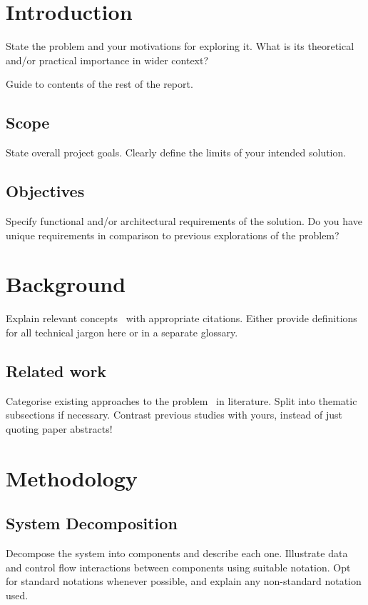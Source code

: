 \chapter{Introduction}

State the problem and your motivations for exploring it. What is its theoretical and/or practical importance in wider context?

Guide to contents of the rest of the report.

\section{Scope}

State overall project goals. Clearly define the limits of your intended solution. 

\section{Objectives}

Specify functional and/or architectural requirements of the solution. Do you have unique requirements in comparison to previous explorations of the problem? 


\chapter{Background}

Explain relevant concepts~\autocite{inbook} with appropriate citations. Either provide definitions for all technical jargon here or in a separate glossary.

\section{Related work}

Categorise existing approaches to the problem~\autocite{confwithpaper} in literature. Split into thematic subsections if necessary. Contrast previous studies with yours, instead of just quoting paper abstracts! 


\chapter{Methodology}

\section{System Decomposition}

Decompose the system into components and describe each one.  Illustrate data and control flow interactions between components using suitable notation. Opt for standard notations whenever possible, and explain any non-standard notation used.


